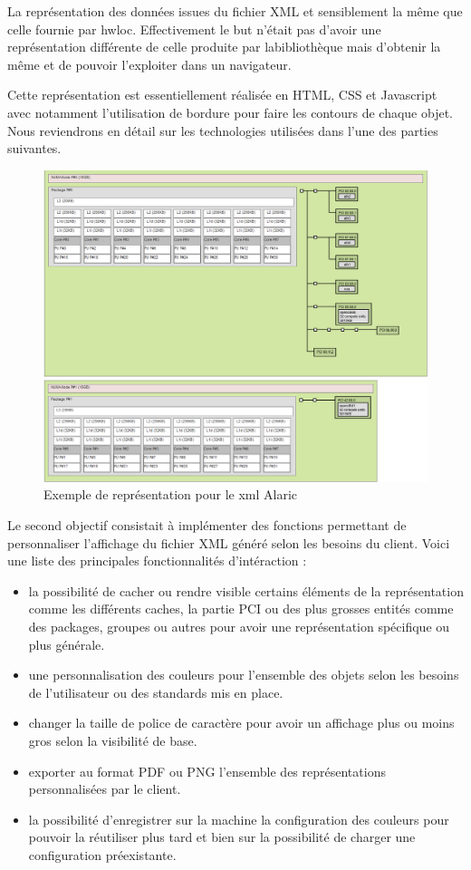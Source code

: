 \documentclass [a4paper,11pt]{article}
\begin{document}
La représentation des données issues du fichier XML et sensiblement la même que celle fournie par hwloc. Effectivement le but n'était pas d'avoir une représentation différente de celle produite par labibliothèque mais d'obtenir la même et de pouvoir l'exploiter dans un navigateur. 
\newline

Cette représentation est essentiellement réalisée en HTML, CSS et Javascript avec notamment l'utilisation de bordure pour faire les contours de chaque objet. Nous reviendrons en détail sur les technologies utilisées dans l'une des parties suivantes.

\begin{figure}[!h]
\centering
\includegraphics[scale=0.5]{img/alaric.png}
\caption[Résultats]{Exemple de représentation pour le xml Alaric}
\end{figure}

Le second objectif consistait à implémenter des fonctions permettant de personnaliser l'affichage du fichier XML généré selon les besoins du client. Voici une liste des principales fonctionnalités d'intéraction : \newline

\begin{itemize}
\item la possibilité de cacher ou rendre visible certains éléments de la représentation comme les différents caches, la partie PCI ou des plus grosses entités comme des packages, groupes ou autres pour avoir une représentation spécifique ou plus générale.
\item une personnalisation des couleurs pour l'ensemble des objets selon les besoins de l'utilisateur ou des standards mis en place.
\item changer la taille de police de caractère pour avoir un affichage plus ou moins gros selon la visibilité de base. 
\item exporter au format PDF ou PNG l'ensemble des représentations personnalisées par le client.
\item la possibilité d'enregistrer sur la machine la configuration des couleurs pour pouvoir la réutiliser plus tard et bien sur la possibilité de charger une configuration préexistante.
\end{itemize}
\end{document}
